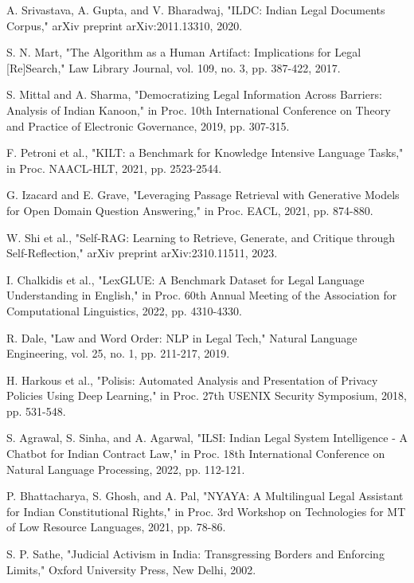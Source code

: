 \documentclass[conference]{IEEEtran}
\begin{document}
\begin{thebibliography}{00}
 A. Srivastava, A. Gupta, and V. Bharadwaj, "ILDC: Indian Legal Documents Corpus," arXiv preprint arXiv:2011.13310, 2020.

 S. N. Mart, "The Algorithm as a Human Artifact: Implications for Legal [Re]Search," Law Library Journal, vol. 109, no. 3, pp. 387-422, 2017.

 S. Mittal and A. Sharma, "Democratizing Legal Information Across Barriers: Analysis of Indian Kanoon," in Proc. 10th International Conference on Theory and Practice of Electronic Governance, 2019, pp. 307-315.

 F. Petroni et al., "KILT: a Benchmark for Knowledge Intensive Language Tasks," in Proc. NAACL-HLT, 2021, pp. 2523-2544.

 G. Izacard and E. Grave, "Leveraging Passage Retrieval with Generative Models for Open Domain Question Answering," in Proc. EACL, 2021, pp. 874-880.

 W. Shi et al., "Self-RAG: Learning to Retrieve, Generate, and Critique through Self-Reflection," arXiv preprint arXiv:2310.11511, 2023.

 I. Chalkidis et al., "LexGLUE: A Benchmark Dataset for Legal Language Understanding in English," in Proc. 60th Annual Meeting of the Association for Computational Linguistics, 2022, pp. 4310-4330.

 R. Dale, "Law and Word Order: NLP in Legal Tech," Natural Language Engineering, vol. 25, no. 1, pp. 211-217, 2019.

 H. Harkous et al., "Polisis: Automated Analysis and Presentation of Privacy Policies Using Deep Learning," in Proc. 27th USENIX Security Symposium, 2018, pp. 531-548.

 S. Agrawal, S. Sinha, and A. Agarwal, "ILSI: Indian Legal System Intelligence - A Chatbot for Indian Contract Law," in Proc. 18th International Conference on Natural Language Processing, 2022, pp. 112-121.

 P. Bhattacharya, S. Ghosh, and A. Pal, "NYAYA: A Multilingual Legal Assistant for Indian Constitutional Rights," in Proc. 3rd Workshop on Technologies for MT of Low Resource Languages, 2021, pp. 78-86.

 S. P. Sathe, "Judicial Activism in India: Transgressing Borders and Enforcing Limits," Oxford University Press, New Delhi, 2002.


\end{thebibliography}
\end{document}
